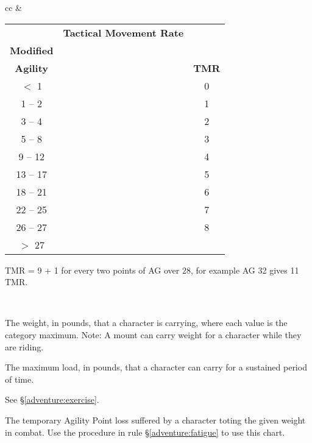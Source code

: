 \begin{tabular}[t]{cc}
&
\begin{minipage}[t]{2.5in}
\begin{tabularx}{2.5in}[t]{cXc}
& \textbf{Tactical Movement Rate} & \\
\textbf{Modified} & \\
\textbf{Agility} & & \textbf{TMR} \\ \hline
 $<$ 1		& & 0 \\ \hline
  1 -- 2	& &  1 \\ \hline
  3 -- 4	& & 2 \\ \hline
  5 -- 8	& & 3 \\ \hline
  9 -- 12	& & 4 \\ \hline
 13 -- 17	& & 5 \\ \hline
 18 -- 21	& & 6 \\ \hline
 22 -- 25	& & 7 \\ \hline
 26 -- 27	& & 8 \\ \hline
$>$ 27		& & \dag \\ \hline
\end{tabularx}

\dag TMR = 9 + 1 for every two points of AG over 28, for example AG 32 gives 11 TMR.
\end{minipage} \\
\end{tabular}

\begin{multicols}{2}

{\setlength\leftmargini{0pt}
\begin{description}
\setlength\itemsep{0pt}
\item[Weight of Load (lbs)] The weight, in pounds, that a character is
carrying, where each value is the category maximum.  Note: A mount can
carry weight for a character while they are riding.

\item[Max] The maximum load, in pounds, that a character can carry for
a sustained period of time.

\item[Rate of Exercise] See \S\ref{adventure:exercise}.

\item[Agility Points Lost] The temporary Agility Point loss suffered
by a character toting the given weight in combat.  Use the procedure
in rule \S\ref{adventure:fatigue} to use this chart.
\end{description}}

\end{multicols}

